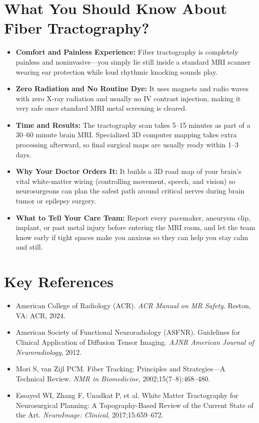 \section{What You Should Know About Fiber Tractography?}

\begin{itemize}
    \item \textbf{Comfort and Painless Experience:} Fiber tractography is completely painless and noninvasive---you simply lie still inside a standard MRI scanner wearing ear protection while loud rhythmic knocking sounds play.
    \item \textbf{Zero Radiation and No Routine Dye:} It uses magnets and radio waves with zero X-ray radiation and usually no IV contrast injection, making it very safe once standard MRI metal screening is cleared.
    \item \textbf{Time and Results:} The tractography scan takes 5--15 minutes as part of a 30--60 minute brain MRI. Specialized 3D computer mapping takes extra processing afterward, so final surgical maps are usually ready within 1--3 days.
    \item \textbf{Why Your Doctor Orders It:} It builds a 3D road map of your brain's vital white-matter wiring (controlling movement, speech, and vision) so neurosurgeons can plan the safest path around critical nerves during brain tumor or epilepsy surgery.
    \item \textbf{What to Tell Your Care Team:} Report every pacemaker, aneurysm clip, implant, or past metal injury before entering the MRI room, and let the team know early if tight spaces make you anxious so they can help you stay calm and still.
\end{itemize}

\section{Key References}

\begin{itemize}
    \item American College of Radiology (ACR). \textit{ACR Manual on MR Safety}. Reston, VA: ACR, 2024.
    \item American Society of Functional Neuroradiology (ASFNR). Guidelines for Clinical Application of Diffusion Tensor Imaging. \textit{AJNR American Journal of Neuroradiology}, 2012.
    \item Mori S, van Zijl PCM. Fiber Tracking: Principles and Strategies---A Technical Review. \textit{NMR in Biomedicine}, 2002;15(7--8):468--480.
    \item Essayed WI, Zhang F, Unadkat P, et al. White Matter Tractography for Neurosurgical Planning: A Topography-Based Review of the Current State of the Art. \textit{NeuroImage: Clinical}, 2017;15:659--672.
\end{itemize}
